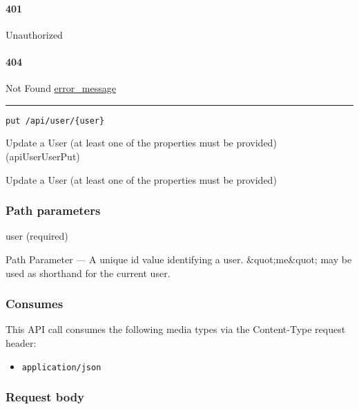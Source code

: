\hypertarget{section-34}{%
\paragraph{401}\label{section-34}}

Unauthorized \protect\hyperlink{}{}

\hypertarget{section-35}{%
\paragraph{404}\label{section-35}}

Not Found \protect\hyperlink{error_message}{error\_message}

\begin{center}\rule{0.5\linewidth}{\linethickness}\end{center}

\protect\hypertarget{apiUserUserPut}{}{}

\begin{verbatim}
put /api/user/{user}
\end{verbatim}

Update a User (at least one of the properties must be provided)
({apiUserUserPut})

Update a User (at least one of the properties must be provided)

\hypertarget{path-parameters-6}{%
\subsubsection{Path parameters}\label{path-parameters-6}}

user (required)

{Path Parameter} --- A unique id value identifying a user.
\&quot;me\&quot; may be used as shorthand for the current user.

\hypertarget{consumes-4}{%
\subsubsection{Consumes}\label{consumes-4}}

This API call consumes the following media types via the {Content-Type}
request header:

\begin{itemize}
\tightlist
\item
  \texttt{application/json}
\end{itemize}

\hypertarget{request-body-4}{%
\subsubsection{Request body}\label{request-body-4}}

